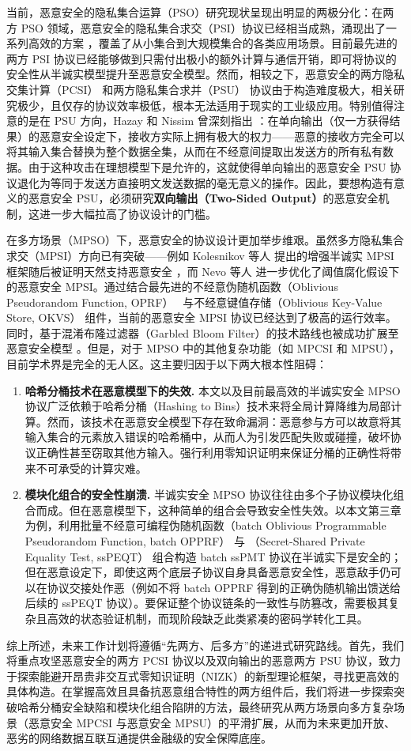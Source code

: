 当前，恶意安全的隐私集合运算（PSO）研究现状呈现出明显的两极分化：在两方 PSO 领域，恶意安全的隐私集合求交（PSI）协议已经相当成熟，涌现出了一系列高效的方案 \cite{RT-CCS-2021, RS-EUROCRYPT-2021, RR-CCS-2022, RindalR17}，覆盖了从小集合到大规模集合的各类应用场景。目前最先进的两方 PSI 协议已经能够做到只需付出极小的额外计算与通信开销，即可将协议的安全性从半诚实模型提升至恶意安全模型。然而，相较之下，恶意安全的两方隐私交集计算（PCSI） \cite{MiaoP0SY20} 和两方隐私集合求并（PSU） \cite{PuGT26} 协议由于构造难度极大，相关研究极少，且仅存的协议效率极低，根本无法适用于现实的工业级应用。特别值得注意的是在 PSU 方向，Hazay 和 Nissim 曾深刻指出 \cite{HN-JOC-2012}：在单向输出（仅一方获得结果）的恶意安全设定下，接收方实际上拥有极大的权力——恶意的接收方完全可以将其输入集合替换为整个数据全集，从而在不经意间提取出发送方的所有私有数据。由于这种攻击在理想模型下是允许的，这就使得单向输出的恶意安全  PSU 协议退化为等同于发送方直接明文发送数据的毫无意义的操作。因此，要想构造有意义的恶意安全 PSU，必须研究\textbf{双向输出（Two-Sided Output）}的恶意安全机制，这进一步大幅拉高了协议设计的门槛。

在多方场景（MPSO）下，恶意安全的协议设计更加举步维艰。虽然多方隐私集合求交（MPSI）方向已有突破——例如 Kolesnikov 等人 \cite{KMPRT-CCS-2017} 提出的增强半诚实 MPSI 框架随后被证明天然支持恶意安全 \cite{GPRTY-CRYPTO-2021}，而 Nevo 等人 \cite{NTY-CCS-2021} 进一步优化了阈值腐化假设下的恶意安全  MPSI。通过结合最先进的不经意伪随机函数（Oblivious Pseudorandom Function, OPRF）~\cite{FIPR-TCC-2005,CM-CRYPTO-2020,RS-EUROCRYPT-2021} 与不经意键值存储（Oblivious Key-Value Store, OKVS）\cite{PRTY20,RR-CCS-2022,BPSY-USENIX-2023} 组件，当前的恶意安全  MPSI 协议已经达到了极高的运行效率。同时，基于混淆布隆过滤器（Garbled Bloom Filter）的技术路线也被成功扩展至恶意安全模型 \cite{BNOP-AsiaCCS-2022}。但是，对于 MPSO 中的其他复杂功能（如 MPCSI 和 MPSU），目前学术界是完全的无人区。这主要归因于以下两大根本性阻碍：
\begin{enumerate}
\item \textbf{哈希分桶技术在恶意模型下的失效.} 本文以及目前最高效的半诚实安全 MPSO 协议广泛依赖于哈希分桶（Hashing to Bins）技术来将全局计算降维为局部计算。然而，该技术在恶意安全模型下存在致命漏洞：恶意参与方可以故意将其输入集合的元素放入错误的哈希桶中，从而人为引发匹配失败或碰撞，破坏协议正确性甚至窃取其他方输入。强行利用零知识证明来保证分桶的正确性将带来不可承受的计算灾难。
\item \textbf{模块化组合的安全性崩溃.} 半诚实安全 MPSO 协议往往由多个子协议模块化组合而成。但在恶意模型下，这种简单的组合会导致安全性失效。以本文第三章为例，利用批量不经意可编程伪随机函数（batch Oblivious Programmable Pseudorandom Function, batch OPPRF） 与 （Secret-Shared Private Equality Test, ssPEQT） 组合构造 batch ssPMT 协议在半诚实下是安全的；但在恶意设定下，即使这两个底层子协议自身具备恶意安全性，恶意敌手仍可以在协议交接处作恶（例如不将 batch OPPRF 得到的正确伪随机输出馈送给后续的 ssPEQT 协议）。要保证整个协议链条的一致性与防篡改，需要极其复杂且高效的状态验证机制，而现阶段缺乏此类紧凑的密码学转化工具。
\end{enumerate}

综上所述，未来工作计划将遵循“先两方、后多方”的递进式研究路线。首先，我们将重点攻坚恶意安全的两方 PCSI 协议以及双向输出的恶意两方 PSU 协议，致力于探索能避开昂贵非交互式零知识证明（NIZK）的新型理论框架，寻找更高效的具体构造。在掌握高效且具备抗恶意组合特性的两方组件后，我们将进一步探索突破哈希分桶安全缺陷和模块化组合陷阱的方法，最终研究从两方场景向多方复杂场景（恶意安全  MPCSI 与恶意安全  MPSU）的平滑扩展，从而为未来更加开放、恶劣的网络数据互联互通提供金融级的安全保障底座。